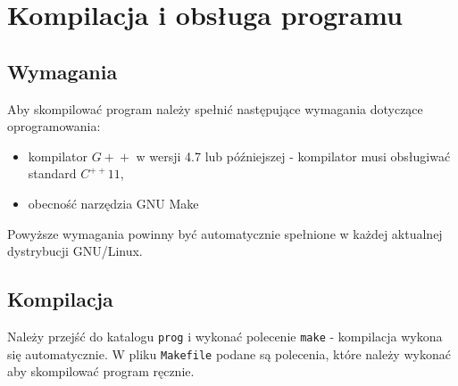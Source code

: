 \documentclass[a4paper,11pt]{article}
\begin{document}
      
  \section{Kompilacja i obsługa programu}
    \subsection{Wymagania}
    Aby skompilować program należy spełnić następujące wymagania dotyczące oprogramowania:
    \begin{itemize}
      \item kompilator $ G\!+\!+ $ w wersji 4.7 lub późniejszej - kompilator musi obsługiwać standard $ C^{++}11 $,
      \item obecność narzędzia GNU Make
    \end{itemize}
    Powyższe wymagania powinny być automatycznie spełnione w każdej aktualnej dystrybucji GNU/Linux.
    
    \subsection{Kompilacja}
    Należy przejść do katalogu \texttt{prog} i wykonać polecenie \texttt{make} - kompilacja wykona się automatycznie. W pliku \texttt{Makefile} podane są polecenia, które należy wykonać aby skompilować program ręcznie.
    
\end{document}
